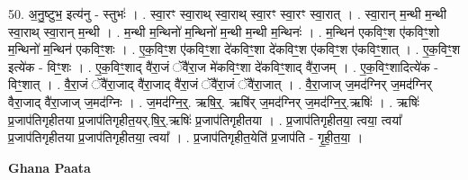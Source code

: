 \documentclass[17pt]{extarticle}
\begin{document}
50. अ॒नु॒ष्टुभ॒ इत्य॑नु - स्तुभः॑ । . स्वा॒रꣳ स्वा॒राथ् स्वा॒राथ् स्वा॒रꣳ स्वा॒रꣳ स्वा॒रात् । . स्वा॒रान् म॒न्थी म॒न्थी स्वा॒राथ् स्वा॒रान् म॒न्थी । . म॒न्थी म॒न्थिनो॑ म॒न्थिनो॑ म॒न्थी म॒न्थी म॒न्थिनः॑ । . म॒न्थिन॑ एकविꣳ॒॒श ए॑कविꣳ॒॒शो म॒न्थिनो॑ म॒न्थिन॑ एकविꣳ॒॒शः । . ए॒क॒विꣳ॒॒श ए॑कविꣳ॒॒शा दे॑कविꣳ॒॒शा दे॑कविꣳ॒॒श ए॑कविꣳ॒॒श ए॑कविꣳ॒॒शात् । . ए॒क॒विꣳ॒॒श इत्ये॑क - विꣳ॒॒शः । . ए॒क॒विꣳ॒॒शाद् वै॑रा॒जं ॅवै॑रा॒ज मे॑कविꣳ॒॒शा दे॑कविꣳ॒॒शाद् वै॑रा॒जम् । . ए॒क॒विꣳ॒॒शादित्ये॑क - विꣳ॒॒शात् । . वै॒रा॒जं ॅवै॑रा॒जाद् वै॑रा॒जाद् वै॑रा॒जं ॅवै॑रा॒जं ॅवै॑रा॒जात् । . वै॒रा॒जाज् ज॒मद॑ग्निर् ज॒मद॑ग्निर् वैरा॒जाद् वै॑रा॒जाज् ज॒मद॑ग्निः । . ज॒मद॑ग्नि॒र्॒. ऋषि॒र्॒. ऋषि॑र् ज॒मद॑ग्निर् ज॒मद॑ग्नि॒र्॒.ऋषिः॑ । . ऋषिः॑ प्र॒जाप॑तिगृहीतया प्र॒जाप॑तिगृहीत॒यर्.षि॒र्॒.ऋषिः॑ प्र॒जाप॑तिगृहीतया । . प्र॒जाप॑तिगृहीतया॒ त्वया॒ त्वया᳚ प्र॒जाप॑तिगृहीतया प्र॒जाप॑तिगृहीतया॒ त्वया᳚ । . प्र॒जाप॑तिगृहीत॒येति॑ प्र॒जाप॑ति - गृ॒ही॒त॒या॒ । \newline

\textbf{Ghana Paata } \newline
\end{document}
